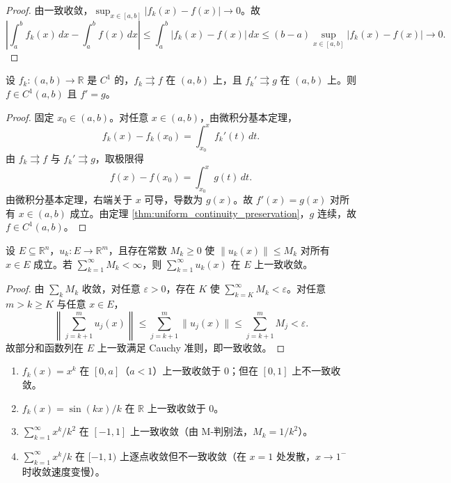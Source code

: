 \begin{proof}
由一致收敛，$\sup_{x \in [a, b]} |f_k(x) - f(x)| \to 0$。故
\[
\left| \int_a^b f_k(x) \, dx - \int_a^b f(x) \, dx \right| \le \int_a^b |f_k(x) - f(x)| \, dx \le (b - a) \sup_{x \in [a, b]} |f_k(x) - f(x)| \to 0.
\]
\end{proof}

\begin{theorem}[一致收敛保持导数]\label{thm:uniform_continuity_derivative}
设 $f_k: (a, b) \to \mathbb{R}$ 是 $C^1$ 的，$f_k \rightrightarrows f$ 在 $(a, b)$ 上，且 $f_k' \rightrightarrows g$ 在 $(a, b)$ 上。则 $f \in C^1(a, b)$ 且 $f' = g$。
\end{theorem}

\begin{proof}
固定 $x_0 \in (a, b)$。对任意 $x \in (a, b)$，由微积分基本定理，
\[
f_k(x) - f_k(x_0) = \int_{x_0}^{x} f_k'(t) \, dt.
\]
由 $f_k \rightrightarrows f$ 与 $f_k' \rightrightarrows g$，取极限得
\[
f(x) - f(x_0) = \int_{x_0}^{x} g(t) \, dt.
\]
由微积分基本定理，右端关于 $x$ 可导，导数为 $g(x)$。故 $f'(x) = g(x)$ 对所有 $x \in (a, b)$ 成立。由定理 \ref{thm:uniform_continuity_preservation}，$g$ 连续，故 $f \in C^1(a, b)$。
\end{proof}

\begin{theorem}\label{thm:weierstrass_m_test_ra}
设 $E \subseteq \mathbb{R}^n$，$u_k: E \to \mathbb{R}^m$，且存在常数 $M_k \ge 0$ 使 $\|u_k(x)\| \le M_k$ 对所有 $x \in E$ 成立。若 $\sum_{k=1}^{\infty} M_k < \infty$，则 $\sum_{k=1}^{\infty} u_k(x)$ 在 $E$ 上一致收敛。
\end{theorem}

\begin{proof}
由 $\sum_k M_k$ 收敛，对任意 $\varepsilon > 0$，存在 $K$ 使 $\sum_{k=K}^{\infty} M_k < \varepsilon$。对任意 $m > k \ge K$ 与任意 $x \in E$，
\[
\left\| \sum_{j=k+1}^{m} u_j(x) \right\| \le \sum_{j=k+1}^{m} \|u_j(x)\| \le \sum_{j=k+1}^{m} M_j < \varepsilon.
\]
故部分和函数列在 $E$ 上一致满足 Cauchy 准则，即一致收敛。
\end{proof}

\begin{example}[一致收敛的实例]\label{ex:uniform_convergence_examples}
\begin{enumerate}[label=(\roman*)]
    \item $f_k(x) = x^k$ 在 $[0, a]$（$a < 1$）上一致收敛于 $0$；但在 $[0, 1]$ 上不一致收敛。
    \item $f_k(x) = \sin(kx)/k$ 在 $\mathbb{R}$ 上一致收敛于 $0$。
    \item $\sum_{k=1}^{\infty} x^k / k^2$ 在 $[-1, 1]$ 上一致收敛（由 M-判别法，$M_k = 1/k^2$）。
    \item $\sum_{k=1}^{\infty} x^k / k$ 在 $[-1, 1)$ 上逐点收敛但不一致收敛（在 $x = 1$ 处发散，$x \to 1^-$ 时收敛速度变慢）。
\end{enumerate}
\end{example}

